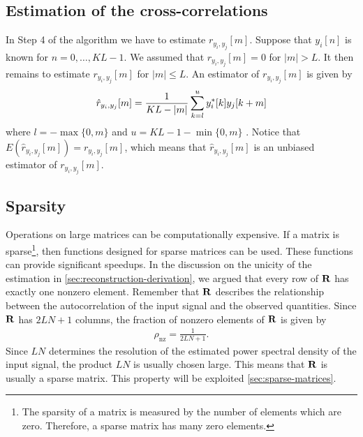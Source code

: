 \documentclass[a4paper, openany, oneside]{memoir}
\begin{document}
\subsection{Estimation of the cross-correlations}
\label{sub:reconstruction-estimation}
In Step 4 of the algorithm we have to estimate $r_{y_i,y_j}[m]$. Suppose that $y_i[n]$ is known for $n = 0,\ldots,KL-1$. We assumed that $r_{y_i,y_j}[m]=0$ for $|m|>L$. It then remains to estimate $r_{y_i,y_j}[m]$ for $|m| \le L$. An estimator of $r_{y_i,y_j}[m]$ is given by
\begin{align} \label{eq:ryij-est}
    \hat{r}_{y_i,y_j}[m] = \frac{1}{KL-|m|}\sum_{k=l}^{u}y^*_i[k]y_j[k+m]
\end{align}
where $l=-\max\{0,m\}$ and $u=KL-1-\min\{0,m\}$ \cite{hayes1996statistical}. Notice that $E(\hat{r}_{y_i,y_j}[m])=r_{y_i,y_j}[m]$, which means that $\hat{r}_{y_i,y_j}[m]$ is an unbiased estimator of $r_{y_i,y_j}[m]$.

\subsection{Sparsity}
\label{sub:reconstruction-sparsity}
Operations on large matrices can be computationally expensive. If a matrix is sparse\footnote{The sparsity of a matrix is measured by the number of elements which are zero. Therefore, a sparse matrix has many zero elements.}, then functions designed for sparse matrices can be used. These functions can provide significant speedups. In the discussion on the unicity of the estimation in \cref{sec:reconstruction-derivation}, we argued that every row of $\boldsymbol{\mathbf{R}}$ has exactly one nonzero element. Remember that $\boldsymbol{\mathbf{R}}$ describes the relationship between the autocorrelation of the input signal and the observed quantities. Since $\boldsymbol{\mathbf{R}}$ has $2LN+1$ columns, the fraction of nonzero elements of $\boldsymbol{\mathbf{R}}$ is given by
\begin{align*}
    \rho_{\text{nz}}=\frac{1}{2LN+1}.
\end{align*}
Since $LN$ determines the resolution of the estimated power spectral density of the input signal, the product $LN$ is usually chosen large. This means that $\boldsymbol{\mathbf{R}}$ is usually a sparse matrix. This property will be exploited \cref{sec:sparse-matrices}.
\end{document}
